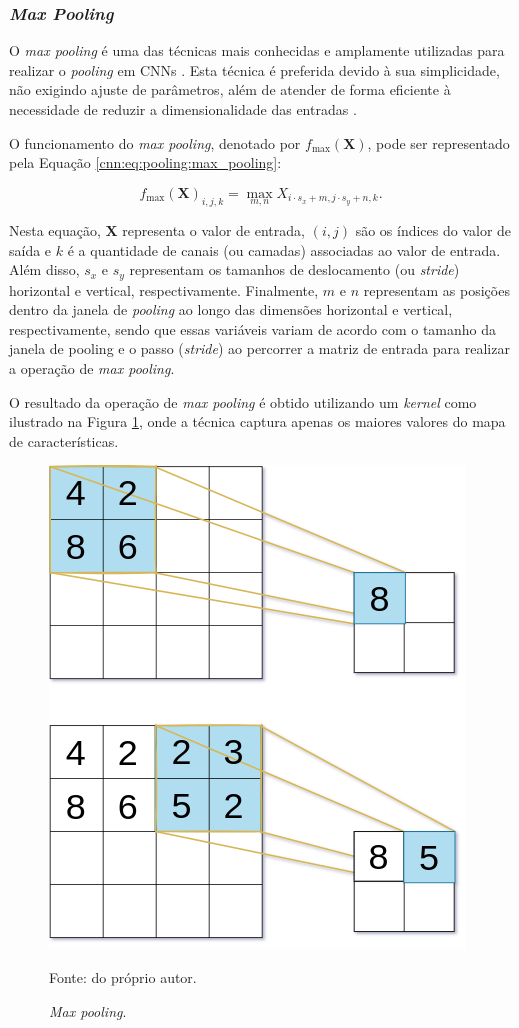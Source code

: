 \subsubsection{\textit{Max Pooling}}
\label{cnn:pooling:max_pooling}
O \textit{max pooling} é uma das técnicas mais conhecidas e amplamente utilizadas para realizar o \textit{pooling} em CNNs \citep{Zafar2022ANetworks, Paul2019DimensionalityPooling}. Esta técnica é preferida devido à sua simplicidade, não exigindo ajuste de parâmetros, além de atender de forma eficiente à necessidade de reduzir a dimensionalidade das entradas \citep{Boureau2010ARecognition}.

O funcionamento do \textit{max pooling}, denotado por $f_{\max}(\boldsymbol{X})$, pode ser representado pela Equação \ref{cnn:eq:pooling:max_pooling}:

\begin{equation}
\label{cnn:eq:pooling:max_pooling}
f_{\max}(\boldsymbol{X})_{i, j, k} = \max_{m, n} X_{i \cdot s_x + m, j \cdot s_{y} + n, k}.
\end{equation}

Nesta equação, $\boldsymbol{X}$ representa o valor de entrada, $(i, j)$ são os índices do valor de saída e $k$ é a quantidade de canais (ou camadas) associadas ao valor de entrada. Além disso, $s_{x}$ e $s_{y}$ representam os tamanhos de deslocamento (ou \textit{stride}) horizontal e vertical, respectivamente. Finalmente, $m$ e $n$ representam as posições dentro da janela de \textit{pooling} ao longo das dimensões horizontal e vertical, respectivamente, sendo que essas variáveis variam de acordo com o tamanho da janela de pooling e o passo (\textit{stride}) ao percorrer a matriz de entrada para realizar a operação de \textit{max pooling}.

O resultado da operação de \textit{max pooling} é obtido utilizando um \textit{kernel} como ilustrado na Figura \ref{cnn:fig:7}, onde a técnica captura apenas os maiores valores do mapa de características.

\begin{figure}[H]
    \centering
    \caption{\textit{Max pooling}.}
    \includegraphics[width=0.5\linewidth]{recursos/imagens/deep/max_pooling.png}
    \label{cnn:fig:7}

    Fonte: do próprio autor.
\end{figure}


